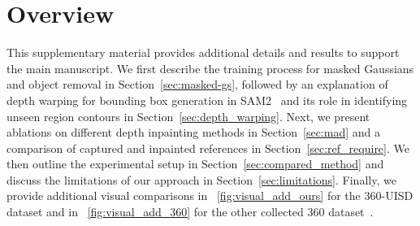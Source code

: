 \label{sec:appendix_section}

\section{Overview}


This supplementary material provides additional details and results to support the main manuscript. We first describe the training process for masked Gaussians and object removal in Section~\ref{sec:masked-gs}, followed by an explanation of depth warping for bounding box generation in SAM2~\cite{ravi2024sam2} and its role in identifying unseen region contours in Section~\ref{sec:depth_warping}. Next, we present ablations on different depth inpainting methods in Section~\ref{sec:mad} and a comparison of captured and inpainted references in Section~\ref{sec:ref_require}. We then outline the experimental setup in Section~\ref{sec:compared_method} and discuss the limitations of our approach in Section~\ref{sec:limitations}. Finally, we provide additional visual comparisons in ~\cref{fig:visual_add_ours} for the 360-UISD dataset and in ~\cref{fig:visual_add_360} for the other collected 360 dataset~\cite{barron2022mip}.


